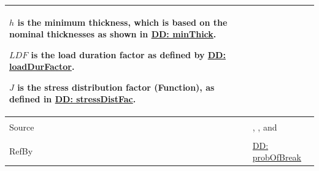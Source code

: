 \documentclass[12pt]{article}
\begin{document}
\begin{minipage}{\textwidth}
\begin{tabular}{>{\raggedright}p{}>{\raggedright\arraybackslash}p{}}
        $h$ is the minimum thickness, which is based on the nominal thicknesses as shown in \hyperref[DD:minThick]{DD: minThick}.
        
        $LDF$ is the load duration factor as defined by \hyperref[DD:loadDurFactor]{DD: loadDurFactor}.
        
        $J$ is the stress distribution factor (Function), as defined in \hyperref[DD:stressDistFac]{DD: stressDistFac}.
        
\\ \midrule \\
Source & \cite{astm2009}, \cite[(Eqs. 4-5)]{beasonEtAl1998}, and \cite[(Eq. 14)]{campidelli}
         
\\ \midrule \\
RefBy & \hyperref[DD:probOfBreak]{DD: probOfBreak}
        
\\ \bottomrule
\end{tabular}
\end{minipage}
\end{document}
